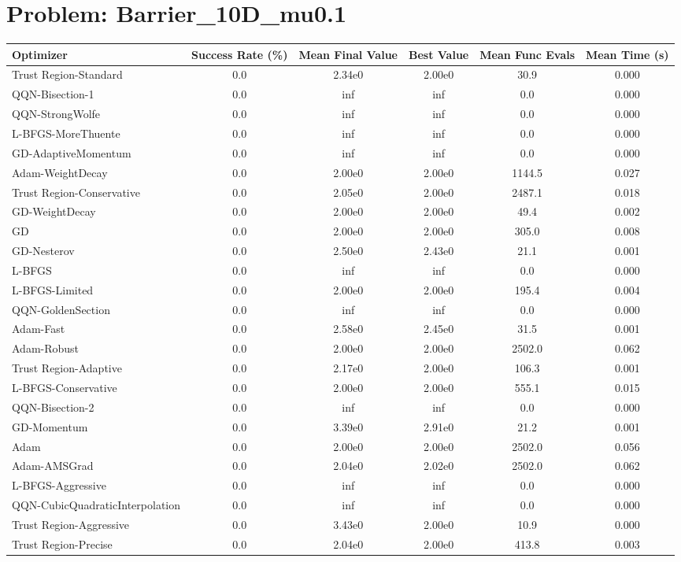 \documentclass{article}
\begin{document}
\section{Problem: Barrier\_10D\_mu0.1}
\begin{longtable}{p{3cm}*{5}{c}}
\toprule
\textbf{Optimizer} & \textbf{Success Rate (\%)} & \textbf{Mean Final Value} & \textbf{Best Value} & \textbf{Mean Func Evals} & \textbf{Mean Time (s)} \\
\midrule
Trust Region-Standard & 0.0 & 2.34e0 & 2.00e0 & 30.9 & 0.000 \\
QQN-Bisection-1 & 0.0 & inf & inf & 0.0 & 0.000 \\
QQN-StrongWolfe & 0.0 & inf & inf & 0.0 & 0.000 \\
L-BFGS-MoreThuente & 0.0 & inf & inf & 0.0 & 0.000 \\
GD-AdaptiveMomentum & 0.0 & inf & inf & 0.0 & 0.000 \\
Adam-WeightDecay & 0.0 & 2.00e0 & 2.00e0 & 1144.5 & 0.027 \\
Trust Region-Conservative & 0.0 & 2.05e0 & 2.00e0 & 2487.1 & 0.018 \\
GD-WeightDecay & 0.0 & 2.00e0 & 2.00e0 & 49.4 & 0.002 \\
GD & 0.0 & 2.00e0 & 2.00e0 & 305.0 & 0.008 \\
GD-Nesterov & 0.0 & 2.50e0 & 2.43e0 & 21.1 & 0.001 \\
L-BFGS & 0.0 & inf & inf & 0.0 & 0.000 \\
L-BFGS-Limited & 0.0 & 2.00e0 & 2.00e0 & 195.4 & 0.004 \\
QQN-GoldenSection & 0.0 & inf & inf & 0.0 & 0.000 \\
Adam-Fast & 0.0 & 2.58e0 & 2.45e0 & 31.5 & 0.001 \\
Adam-Robust & 0.0 & 2.00e0 & 2.00e0 & 2502.0 & 0.062 \\
Trust Region-Adaptive & 0.0 & 2.17e0 & 2.00e0 & 106.3 & 0.001 \\
L-BFGS-Conservative & 0.0 & 2.00e0 & 2.00e0 & 555.1 & 0.015 \\
QQN-Bisection-2 & 0.0 & inf & inf & 0.0 & 0.000 \\
GD-Momentum & 0.0 & 3.39e0 & 2.91e0 & 21.2 & 0.001 \\
Adam & 0.0 & 2.00e0 & 2.00e0 & 2502.0 & 0.056 \\
Adam-AMSGrad & 0.0 & 2.04e0 & 2.02e0 & 2502.0 & 0.062 \\
L-BFGS-Aggressive & 0.0 & inf & inf & 0.0 & 0.000 \\
QQN-CubicQuadraticInterpolation & 0.0 & inf & inf & 0.0 & 0.000 \\
Trust Region-Aggressive & 0.0 & 3.43e0 & 2.00e0 & 10.9 & 0.000 \\
Trust Region-Precise & 0.0 & 2.04e0 & 2.00e0 & 413.8 & 0.003 \\
\bottomrule
\end{longtable}
\end{document}
